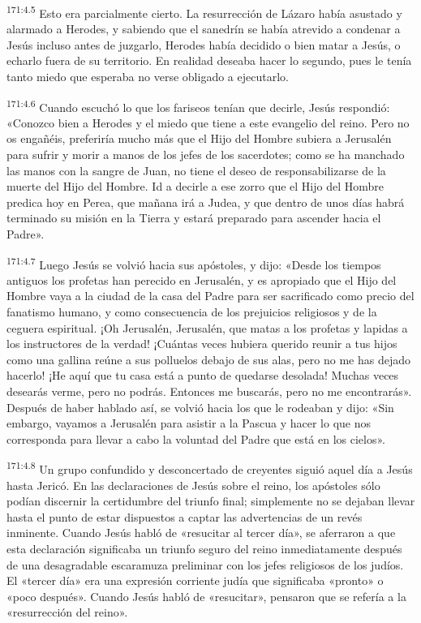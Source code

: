 \par 
\textsuperscript{171:4.5} Esto era parcialmente cierto. La resurrección de Lázaro había asustado y alarmado a Herodes, y sabiendo que el sanedrín se había atrevido a condenar a Jesús incluso antes de juzgarlo, Herodes había decidido o bien matar a Jesús, o echarlo fuera de su territorio. En realidad deseaba hacer lo segundo, pues le tenía tanto miedo que esperaba no verse obligado a ejecutarlo.

\par 
\textsuperscript{171:4.6} Cuando escuchó lo que los fariseos tenían que decirle, Jesús respondió: «Conozco bien a Herodes y el miedo que tiene a este evangelio del reino. Pero no os engañéis, preferiría mucho más que el Hijo del Hombre subiera a Jerusalén para sufrir y morir a manos de los jefes de los sacerdotes; como se ha manchado las manos con la sangre de Juan, no tiene el deseo de responsabilizarse de la muerte del Hijo del Hombre. Id a decirle a ese zorro que el Hijo del Hombre predica hoy en Perea, que mañana irá a Judea, y que dentro de unos días habrá terminado su misión en la Tierra y estará preparado para ascender hacia el Padre».

\par 
\textsuperscript{171:4.7} Luego Jesús se volvió hacia sus apóstoles, y dijo: «Desde los tiempos antiguos los profetas han perecido en Jerusalén, y es apropiado que el Hijo del Hombre vaya a la ciudad de la casa del Padre para ser sacrificado como precio del fanatismo humano, y como consecuencia de los prejuicios religiosos y de la ceguera espiritual. ¡Oh Jerusalén, Jerusalén, que matas a los profetas y lapidas a los instructores de la verdad! ¡Cuántas veces hubiera querido reunir a tus hijos como una gallina reúne a sus polluelos debajo de sus alas, pero no me has dejado hacerlo! ¡He aquí que tu casa está a punto de quedarse desolada! Muchas veces desearás verme, pero no podrás. Entonces me buscarás, pero no me encontrarás». Después de haber hablado así, se volvió hacia los que le rodeaban y dijo: «Sin embargo, vayamos a Jerusalén para asistir a la Pascua y hacer lo que nos corresponda para llevar a cabo la voluntad del Padre que está en los cielos».

\par 
\textsuperscript{171:4.8} Un grupo confundido y desconcertado de creyentes siguió aquel día a Jesús hasta Jericó. En las declaraciones de Jesús sobre el reino, los apóstoles sólo podían discernir la certidumbre del triunfo final; simplemente no se dejaban llevar hasta el punto de estar dispuestos a captar las advertencias de un revés inminente. Cuando Jesús habló de «resucitar al tercer día», se aferraron a que esta declaración significaba un triunfo seguro del reino inmediatamente después de una desagradable escaramuza preliminar con los jefes religiosos de los judíos. El «tercer día» era una expresión corriente judía que significaba «pronto» o «poco después». Cuando Jesús habló de «resucitar», pensaron que se refería a la «resurrección del reino».

